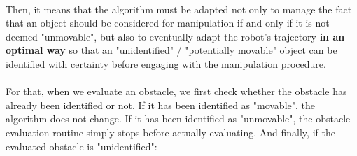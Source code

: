 \paragraph{} Then, it means that the algorithm must be adapted not only to manage the fact that an object should be considered for manipulation if and only if it is not deemed "unmovable", but also to eventually adapt the robot's trajectory \textbf{in an optimal way} so that an "unidentified" / "potentially movable" object can be identified with certainty before engaging with the manipulation procedure.

\paragraph{} For that, when we evaluate an obstacle, we first check whether the obstacle has already been identified or not. If it has been identified as "movable", the algorithm does not change. If it has been identified as "unmovable", the obstacle evaluation routine simply stops before actually evaluating. And finally, if the evaluated obstacle is "unidentified":



